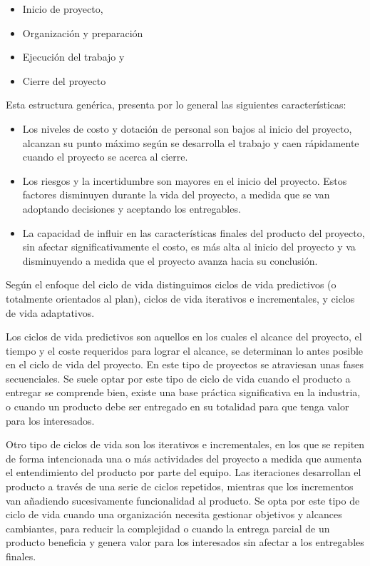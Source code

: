 \begin{itemize}
\item{Inicio de proyecto,}
\item{Organización y preparación}
\item{Ejecución del trabajo y}
\item{Cierre del proyecto}
\end{itemize}

Esta estructura genérica, presenta por lo general las siguientes características:

\begin{itemize}

\item{Los  niveles  de  costo  y  dotación  de  personal  son  bajos  al  inicio  del  proyecto,  alcanzan  su  punto  máximo según se desarrolla el trabajo y caen rápidamente cuando el proyecto se acerca al cierre.}

\item{Los  riesgos  y  la  incertidumbre son  mayores  en  el  inicio  del  proyecto. Estos factores disminuyen durante la vida del proyecto, a medida que se van adoptando decisiones y aceptando los entregables.}

\item{La  capacidad  de  influir  en  las  características  finales  del  producto  del  proyecto,  sin  afectar  significativamente  el  costo,  es  más  alta  al  inicio  del  proyecto  y  va  disminuyendo  a  medida  que  el  proyecto  avanza  hacia  su  conclusión.}

\end{itemize}

Según el enfoque del ciclo de vida distinguimos ciclos de vida predictivos (o totalmente orientados al plan), ciclos de vida iterativos e incrementales, y ciclos de vida adaptativos.

Los ciclos de vida predictivos son aquellos en los cuales el alcance del proyecto, el tiempo y el coste requeridos para lograr el alcance, se determinan lo antes posible en el ciclo de vida del proyecto. En este tipo de proyectos se atraviesan unas fases secuenciales. Se suele optar por este tipo de ciclo de vida cuando el producto a entregar se comprende bien, existe una base práctica significativa en la industria, o cuando un producto debe ser entregado en su totalidad para que tenga valor para los interesados.

Otro tipo de ciclos de vida son los iterativos e incrementales, en los que se repiten de forma intencionada una o más actividades del proyecto a medida que aumenta el entendimiento del producto por parte del equipo. Las iteraciones desarrollan el producto a través de una serie de ciclos repetidos, mientras que los incrementos van añadiendo sucesivamente funcionalidad al producto. Se opta por este tipo de ciclo de vida cuando una organización necesita gestionar objetivos y alcances cambiantes, para reducir la complejidad o cuando la entrega parcial de un producto beneficia y genera valor para los interesados sin afectar a los entregables finales.

